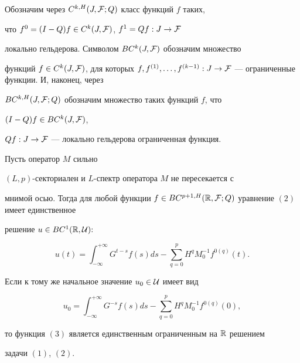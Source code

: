 Обозначим через $C^{k,H}(J,{\cal


F};Q)$ класс функций $f$ таких,


что $f^0=(I-Q)f\in C^k(J,{\cal F})$, $f^1=Qf:J\to{\cal F}$


локально гельдерова. Символом $BC^k(J,{\cal F})$ обозначим множество 


функций $f\in C^k(J,{\cal F})$, для которых $f,f^{(1)},\dotsc,


f^{(k-1)}:J\to{\cal F}$ --- ограниченные функции. И, наконец, через


$BC^{k,H}(J,{\cal F};Q)$ обозначим множество таких функций $f$, что\linebreak


$(I-Q)f\in BC^k(J,{\cal F})$, 


$Qf:J\to{\cal F}$ --- локально гельдерова ограниченная функция.








\begin{thm}


Пусть оператор $M$ сильно


$(L,p)$-секториален и $L$-спектр оператора $M$ не пересекается с


мнимой осью. Тогда для любой функции $f \in BC^{p+1,H}({\Bbb


R},{\cal F};Q)$ уравнение $(2)$ имеет единственное


решение $u\in BC^{1}({\Bbb R},{\cal U}){:}$


\begin{equation}


u(t)= \int_{-\infty}^{+\infty} G^{t-s}f(s) ds -


\sum_{q=0}^p H^qM_0^{-1}f^{0(q)}(t).


\end{equation}


Если к тому же начальное значение $u_{0} \in {\cal U}$ имеет вид


$$


u_{0}= \int_{-\infty}^{+\infty} G^{-s}f(s) ds -


\sum_{q=0}^p H^qM_0^{-1}f^{0(q)}(0),


$$


то функция $(3)$ является единственным ограниченным на ${\Bbb R}$ решением


задачи $(1)$, $(2)$.


\end{thm}









